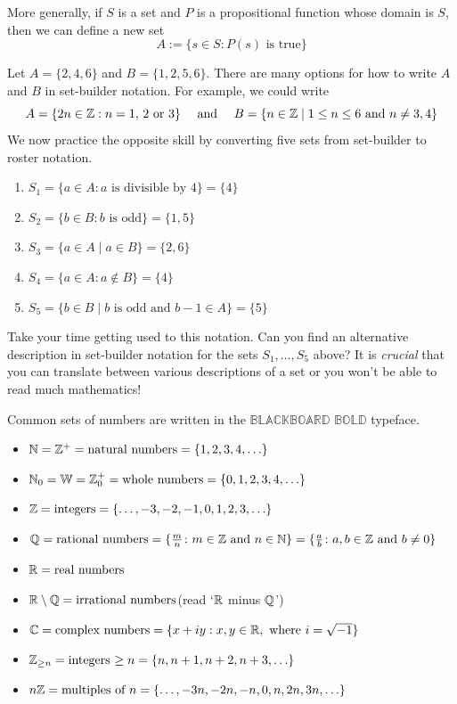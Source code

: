 More generally, if $S$ is a set and $P$ is a propositional function whose domain is $S$, then we can define a new set
\[
	A:=\{s\in S:P(s)\text{ is true}\}
\]

\begin{example}{}{}
	Let $A=\{2,4,6\}$ and $B=\{1,2,5,6\}$. There are many options for how to write $A$ and $B$ in set-builder notation. For example, we could write
	\[
		A=\{2n\in\mathbb{Z}:n=1,\,2\text{ or }3\}\quad\text{ and }\quad B=\{n\in\mathbb{Z}\mid 1\le n\le 6\text{ and }n\neq 3,4\}
	\]
	We now practice the opposite skill by converting five sets from set-builder to roster notation.
	\begin{enumerate}
	  \item[] $S_1=\{a\in A:a\text{ is divisible by 4}\}=\{4\}$
	  \item[] $S_2=\{b\in B:b\text{ is odd}\}=\{1,5\}$
	  \item[] $S_3=\{a\in A\mid a\in B\}=\{2,6\}$
	  \item[] $S_4=\{a\in A:a\not\in B\}=\{4\}$
	  \item[] $S_5=\{b\in B\mid b\text{ is odd and $b-1\in A$}\}=\{5\}$
	\end{enumerate}
\end{example}

Take your time getting used to this notation. Can you find an alternative description in set-builder notation for the sets $S_1,\ldots,S_5$ above? It is \emph{crucial} that you can translate between various descriptions of a set or you won't be able to read much mathematics!



Common sets of numbers are written in the $\mathbb{B}${\scriptsize $\mathbb{LACKBOARD}$} $\mathbb{B}${\scriptsize $\mathbb{OLD}$} typeface.
\begin{itemize}\setlength{\itemsep}{0pt}
  \item[] $\mathbb{N}=\mathbb{Z}^+=\text{natural numbers}=\{1,2,3,4,\ldots\}$
	\item[] $\mathbb{N}_0=\mathbb{W}=\mathbb{Z}_0^+=\text{whole numbers}=\{0,1,2,3,4,\ldots\}$
	\item[] $\mathbb{Z}=\text{integers}=\{\ldots,-3,-2,-1,0,1,2,3,\ldots\}$
	\item[] $\mathbb{Q}=\text{rational numbers}=\{\frac mn\colon m\in\mathbb{Z}\text{ and }n\in\mathbb{N}\} =\{\frac ab\colon a,b\in\mathbb{Z}\text{ and }b\neq 0\}$
	\item[] $\mathbb{R}=\text{real numbers}$
	\item[] $\mathbb{R}\setminus\mathbb{Q}=\text{irrational numbers}$\qquad (read `$\mathbb{R}$ minus $\mathbb{Q}$')
	\item[] $\mathbb{C}=\text{complex numbers}=\{x+iy:x,y\in\mathbb{R},\text{ where }i=\sqrt{-1}\}$
	\item[] $\mathbb{Z}_{\ge n}=\text{integers $\ge n$}=\{n,n+1,n+2,n+3,\ldots\}$
	\item[] $n\mathbb{Z}=\text{multiples of $n$}=\{\ldots,-3n,-2n,-n,0,n,2n,3n,\ldots\}$
\end{itemize}

